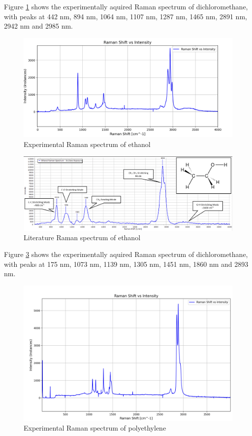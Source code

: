 Figure \ref{fig:eth_x} shows the experimentally aquired Raman spectrum of dichloromethane, with peaks at 442 nm, 894 nm, 1064 nm, 1107 nm, 1287 nm, 1465 nm, 2891 nm, 2942 nm and 2985 nm.
\begin{figure}[h]
    \includegraphics[width=\textwidth]{images/raman_spectra/raman_shift_ethanol.png}
    \caption{Experimental Raman spectrum of ethanol}
    \label{fig:eth_x}
\end{figure}

\begin{figure}[h]
    \centering
    \includegraphics[width=\textwidth]{images/lit_raman/ethanol.png}
    \caption{Literature Raman spectrum of ethanol \cite{spectrumeth}}
    \label{fig:eth_l}
\end{figure}

Figure \ref{fig:pe_x} shows the experimentally aquired Raman spectrum of dichloromethane, with peaks at 175 nm, 1073 nm, 1139 nm, 1305 nm, 1451 nm, 1860 nm and 2893 nm. 

\begin{figure}[h]
    \centering
    \includegraphics[width=\textwidth]{images/raman_spectra/raman_shift_polyethyleneh.png}
    \caption{Experimental Raman spectrum of polyethylene}
    \label{fig:pe_x}
\end{figure}

